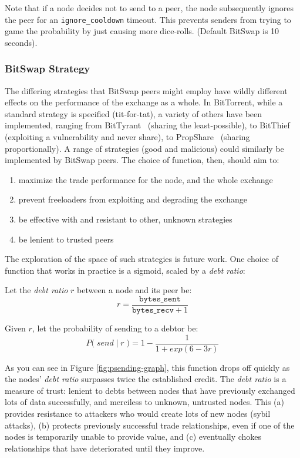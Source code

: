 \documentclass{sig-alternate}
\begin{document}
Note that if a node decides not to send to a peer, the node subsequently
ignores the peer for an \texttt{ignore\_cooldown} timeout. This prevents
senders from trying to game the probability by just causing more dice-rolls.
(Default BitSwap is 10 seconds).

\subsubsection{BitSwap Strategy}

The differing strategies that BitSwap peers might employ have wildly different effects on the performance of the exchange as a whole. In BitTorrent, while a standard strategy is specified (tit-for-tat), a variety of others have been implemented, ranging from BitTyrant~\cite{levin08} (sharing the least-possible), to BitThief~\cite{levin08} (exploiting a vulnerability and never share), to PropShare~\cite{levin08} (sharing proportionally). A range of strategies (good and malicious) could similarly be implemented by BitSwap peers. The choice of function, then, should aim to:

\begin{enumerate}
  \item maximize the trade performance for the node, and the whole exchange
  \item prevent freeloaders from exploiting and degrading the exchange
  \item be effective with and resistant to other, unknown
  strategies
  \item be lenient to trusted peers
\end{enumerate}

The exploration of the space of such strategies is future work.
One choice of function that works in practice is a sigmoid, scaled by a
\textit{debt ratio}:

Let the \textit{debt ratio} $ r $ between a node and its peer be:
  \[ r = \dfrac{\texttt{bytes\_sent}}{\texttt{bytes\_recv} + 1} \]

Given $r$, let the probability of sending to a debtor be:
  \[ P\Big( \; send \; | \; r \;\Big) = 1 - \dfrac{1}{1 + exp(6-3r)} \]



As you can see in Figure \ref{fig:psending-graph}, this function drops off quickly as the nodes'
\textit{debt ratio} surpasses twice the established credit.
The \textit{debt ratio} is a measure of trust:
lenient to debts between nodes that have previously exchanged lots of data
successfully, and merciless to unknown, untrusted nodes. This
(a) provides resistance to attackers who would create lots of new nodes
(sybil attacks),
(b) protects previously successful trade relationships, even if one of the
nodes is temporarily unable to provide value, and
(c) eventually chokes relationships that have deteriorated until they
improve.
\end{document}
